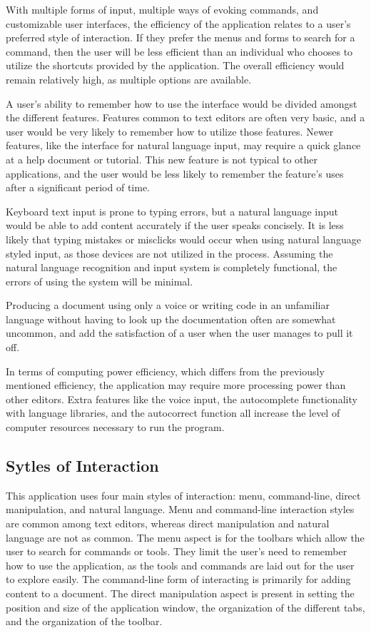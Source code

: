 \documentclass[11pt, oneside]{article}
\begin{document}
With multiple forms of input, multiple ways of evoking commands, and customizable user interfaces, the efficiency of the application relates to a user's preferred style of interaction. If they prefer the menus and forms to search for a command, then the user will be less efficient than an individual who chooses to utilize the shortcuts provided by the application. The overall efficiency would remain relatively high, as multiple options are available. 

A user's ability to remember how to use the interface would be divided amongst the different features. Features common to text editors are often very basic, and a user would be very likely to remember how to utilize those features. Newer features, like the interface for natural language input, may require a quick glance at a help document or tutorial. This new feature is not typical to other applications, and the user would be less likely to remember the feature's uses after a significant period of time.

Keyboard text input is prone to typing errors, but a natural language input would be able to add content accurately if the user speaks concisely. It is less likely that typing mistakes or misclicks would occur when using natural language styled input, as those devices are not utilized in the process. Assuming the natural language recognition and input system is completely functional, the errors of using the system will be minimal.

Producing a document using only a voice or writing code in an unfamiliar language without having to look up the documentation often are somewhat uncommon, and add the satisfaction of a user when the user manages to pull it off. 

In terms of computing power efficiency, which differs from the previously mentioned efficiency, the application may require more processing power than other editors. Extra features like the voice input, the autocomplete functionality with language libraries, and the autocorrect function all increase the level of computer resources necessary to run the program.

\subsection{Sytles of Interaction}
This application uses four main styles of interaction: menu, command-line, direct manipulation, and natural language. Menu and command-line interaction styles are common among text editors, whereas direct manipulation and natural language are not as common. The menu aspect is for the toolbars which allow the user to search for commands or tools. They limit the user's need to remember how to use the application, as the tools and commands are laid out for the user to explore easily. The command-line form of interacting is primarily for adding content to a document. The direct manipulation aspect is present in setting the position and size of the application window, the organization of the different tabs, and the organization of the toolbar. 
\end{document}
